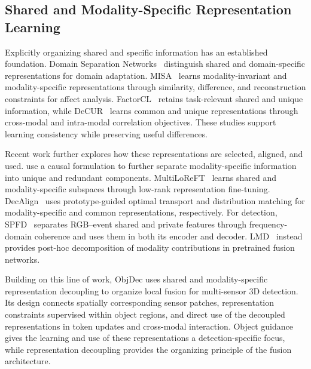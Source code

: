 \subsection{Shared and Modality-Specific Representation Learning}
\label{subsec:22}

Explicitly organizing shared and specific information has an established foundation. Domain Separation Networks~\citep{bousmalis2016dsn} distinguish shared and domain-specific representations for domain adaptation. MISA~\citep{hazarika2020misa} learns modality-invariant and modality-specific representations through similarity, difference, and reconstruction constraints for affect analysis. FactorCL~\citep{liang2023factorcl} retains task-relevant shared and unique information, while DeCUR~\citep{wang2024decur} learns common and unique representations through cross-modal and intra-modal correlation objectives. These studies support learning consistency while preserving useful differences.

Recent work further explores how these representations are selected, aligned, and used. \citet{liu2025featurecausality} use a causal formulation to further separate modality-specific information into unique and redundant components. MultiLoReFT~\citep{tonekaboni2026multiloreft} learns shared and modality-specific subspaces through low-rank representation fine-tuning. DecAlign~\citep{qian2026decalign} uses prototype-guided optimal transport and distribution matching for modality-specific and common representations, respectively. For detection, SPFD~\citep{wang2026spfd} separates RGB--event shared and private features through frequency-domain coherence and uses them in both its encoder and decoder. LMD~\citep{park2025lmd} instead provides post-hoc decomposition of modality contributions in pretrained fusion networks.

Building on this line of work, ObjDec uses shared and modality-specific representation decoupling to organize local fusion for multi-sensor 3D detection. Its design connects spatially corresponding sensor patches, representation constraints supervised within object regions, and direct use of the decoupled representations in token updates and cross-modal interaction. Object guidance gives the learning and use of these representations a detection-specific focus, while representation decoupling provides the organizing principle of the fusion architecture.
